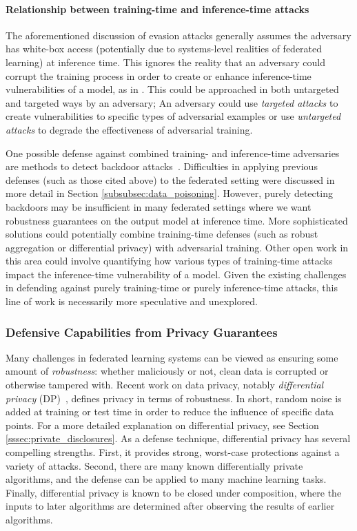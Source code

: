 \paragraph{Relationship between training-time and inference-time attacks}\label{p:training-inference-attacks} 
The aforementioned discussion of evasion attacks generally assumes the adversary has white-box access (potentially due to systems-level realities of federated learning) at inference time. This ignores the reality that an adversary could corrupt the training process in order to create or enhance inference-time vulnerabilities of a model, as in \cite{chen2017targeted}. This could be approached in both untargeted and targeted ways by an adversary; An adversary could use \emph{targeted attacks} to create vulnerabilities to specific types of adversarial examples \cite{chen2017targeted, gu2017badnets} or use \emph{untargeted attacks} to degrade the effectiveness of adversarial training.

One possible defense against combined training- and inference-time adversaries are methods to detect backdoor attacks~\cite{tran2018spectral, chen2018detecting, wang2019neural,chou2018sentinet}. Difficulties in applying previous defenses (such as those cited above) to the federated setting were discussed in more detail in Section \ref{subsubsec:data_poisoning}. However, purely detecting backdoors may be insufficient in many federated settings where we want robustness guarantees on the output model at inference time. More sophisticated solutions could potentially combine training-time defenses (such as robust aggregation or differential privacy) with adversarial training. Other open work in this area could involve quantifying how various types of training-time attacks impact the inference-time vulnerability of a model. Given the existing challenges in defending against purely training-time or purely inference-time attacks, this line of work is necessarily more speculative and unexplored.

\subsubsection{Defensive Capabilities from Privacy Guarantees}

Many challenges in federated learning systems can be viewed as ensuring some amount of \emph{robustness}: whether maliciously or not, clean data is corrupted or otherwise tampered with. Recent work on data privacy, notably \emph{differential privacy} (DP)~\citep{DMNS06}, defines privacy in terms of robustness. In short, random noise is added at training or test time in order to reduce the influence of specific data points. For a more detailed explanation on differential privacy, see Section \ref{sssec:private_disclosures}. As a defense technique, differential privacy has several compelling strengths. First, it provides strong, worst-case protections against a variety of attacks. Second, there are many known differentially private algorithms, and the defense can be applied to many machine learning tasks. Finally, differential privacy is known to be closed under composition, where the inputs to later algorithms are determined after observing the results of earlier algorithms.

